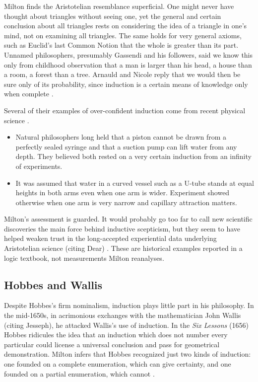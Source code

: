 Milton finds the Aristotelian resemblance superficial. One might never have
thought about triangles without seeing one, yet the general and certain
conclusion about all triangles rests on considering the idea of a triangle
in one's mind, not on examining all triangles. The same holds for very
general axioms, such as Euclid's last Common Notion that the whole is
greater than its part. Unnamed philosophers, presumably Gassendi and his
followers, said we know this only from childhood observation that a man is
larger than his head, a house than a room, a forest than a tree. Arnauld
and Nicole reply that we would then be sure only of its probability, since
induction is a certain means of knowledge only when complete
\cite[pp.~30--31]{Milton2011InductionBeforeHume}.

Several of their examples of over-confident induction come from recent
physical science \cite[p.~31]{Milton2011InductionBeforeHume}.
\begin{itemize}
\item Natural philosophers long held that a piston cannot be drawn from a
  perfectly sealed syringe and that a suction pump can lift water from any
  depth. They believed both rested on a very certain induction from an
  infinity of experiments.
\item It was assumed that water in a curved vessel such as a U-tube stands
  at equal heights in both arms even when one arm is wider. Experiment
  showed otherwise when one arm is very narrow and capillary attraction
  matters.
\end{itemize}
Milton's assessment is guarded. It would probably go too far to call new
scientific discoveries the main force behind inductive scepticism, but they
seem to have helped weaken trust in the long-accepted experiential data
underlying Aristotelian science (citing Dear)
\cite[p.~31]{Milton2011InductionBeforeHume}. These are historical examples
reported in a logic textbook, not measurements Milton reanalyses.

\subsection{Hobbes and Wallis}

Despite Hobbes's firm nominalism, induction plays little part in his
philosophy. In the mid-1650s, in acrimonious exchanges with the
mathematician John Wallis (citing Jesseph), he attacked Wallis's use of
induction. In the \emph{Six Lessons} (1656) Hobbes ridicules the idea that an
induction which does not number every particular could license a universal
conclusion and pass for geometrical demonstration. Milton infers
that Hobbes recognized just two kinds of induction: one founded on a
complete enumeration, which can give certainty, and one founded on a
partial enumeration, which cannot \cite[p.~31]{Milton2011InductionBeforeHume}.

